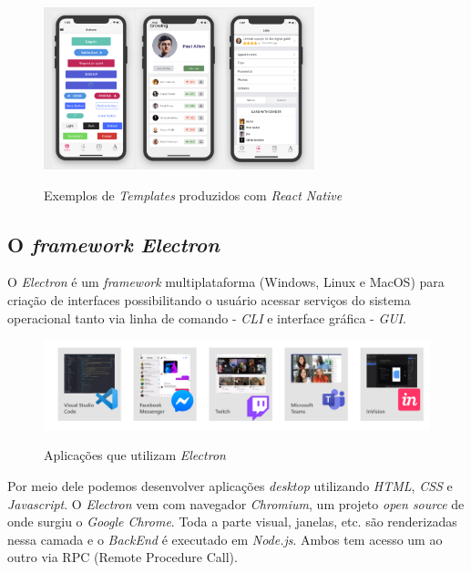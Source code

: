 \begin{figure}[H]
	\centering
	\caption{Exemplos de \textit{Templates} produzidos com \textit{React Native}}
	\includegraphics[width=0.7\textwidth]{figuras/react_native_elements.png}
	\label{fig:youcto-fluxo}
\end{figure} 

\subsection{O \textit{framework Electron}}

O \textit{Electron} é um \textit{framework} multiplataforma (Windows, Linux e MacOS) para criação de interfaces possibilitando o usuário acessar serviços do sistema operacional tanto via linha de comando - \textit{CLI} e interface gráfica - \textit{GUI}.

\begin{figure}[H]
	\centering
	\caption{Aplicações que utilizam \textit{Electron}}
	\includegraphics[width=1.0\textwidth]{figuras/electron_apps.png}
	\label{fig:youcto-fluxo}
\end{figure} 

Por meio dele podemos desenvolver aplicações \textit{desktop} utilizando \textit{HTML}, \textit{CSS} e \textit{Javascript}. O \textit{Electron} vem com navegador \textit{Chromium}, um projeto \textit{open source} de onde surgiu o \textit{Google Chrome}. Toda a parte visual, janelas, etc. são renderizadas nessa camada e o \textit{BackEnd} é executado em \textit{Node.js}. Ambos tem acesso um ao outro via RPC (Remote Procedure Call).



